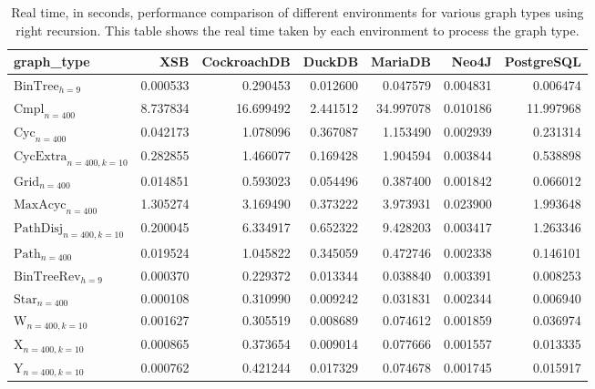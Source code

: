 \begin{table}
\caption{Real time, in seconds, performance comparison of different environments for various graph types using right recursion. This table shows the real time taken by each environment to process the graph type.}
\label{table:results}
\begin{tabular}{lrrrrrr}
\toprule
graph\_type & XSB & CockroachDB & DuckDB & MariaDB & Neo4J & PostgreSQL \\
\midrule
$\text{BinTree}_{h=9}$ & 0.000533 & 0.290453 & 0.012600 & 0.047579 & 0.004831 & 0.006474 \\
$\text{Cmpl}_{n=400}$ & 8.737834 & 16.699492 & 2.441512 & 34.997078 & 0.010186 & 11.997968 \\
$\text{Cyc}_{n=400}$ & 0.042173 & 1.078096 & 0.367087 & 1.153490 & 0.002939 & 0.231314 \\
$\text{CycExtra}_{n=400,k=10}$ & 0.282855 & 1.466077 & 0.169428 & 1.904594 & 0.003844 & 0.538898 \\
$\text{Grid}_{n=400}$ & 0.014851 & 0.593023 & 0.054496 & 0.387400 & 0.001842 & 0.066012 \\
$\text{MaxAcyc}_{n=400}$ & 1.305274 & 3.169490 & 0.373222 & 3.973931 & 0.023900 & 1.993648 \\
$\text{PathDisj}_{n=400,k=10}$ & 0.200045 & 6.334917 & 0.652322 & 9.428203 & 0.003417 & 1.263346 \\
$\text{Path}_{n=400}$ & 0.019524 & 1.045822 & 0.345059 & 0.472746 & 0.002338 & 0.146101 \\
$\text{BinTreeRev}_{h=9}$ & 0.000370 & 0.229372 & 0.013344 & 0.038840 & 0.003391 & 0.008253 \\
$\text{Star}_{n=400}$ & 0.000108 & 0.310990 & 0.009242 & 0.031831 & 0.002344 & 0.006940 \\
$\text{W}_{n=400,k=10}$ & 0.001627 & 0.305519 & 0.008689 & 0.074612 & 0.001859 & 0.036974 \\
$\text{X}_{n=400, k=10}$ & 0.000865 & 0.373654 & 0.009014 & 0.077666 & 0.001557 & 0.013335 \\
$\text{Y}_{n=400,k=10}$ & 0.000762 & 0.421244 & 0.017329 & 0.074678 & 0.001745 & 0.015917 \\
\bottomrule
\end{tabular}
\end{table}
